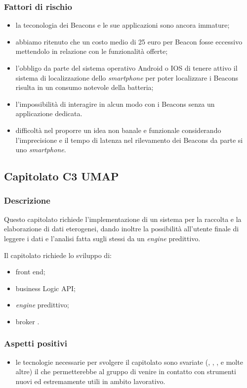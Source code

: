 \documentclass[12pt,a4paper]{article}
\begin{document}
\subsubsection{Fattori di rischio}
\begin{itemize}
\item la teconologia dei Beacons  e le sue applicazioni sono ancora immature;
\item abbiamo ritenuto che un costo medio di 25 euro per Beacon fosse eccessivo mettendolo in relazione con le funzionalità offerte;
\item l'obbligo da parte del sistema operativo Android o IOS di tenere attivo il sistema di localizzazione dello \textit{smartphone} per poter localizzare i Beacons risulta in un consumo notevole della batteria;
\item l'impossibilità di interagire in alcun modo con i Beacons senza un applicazione dedicata.
\item difficoltà nel proporre un idea non banale e funzionale considerando l'imprecisione e il tempo di latenza nel rilevamento dei Beacons da parte si uno \textit{smartphone}.
\end{itemize}

\newpage
\subsection{Capitolato C3 UMAP}

\subsubsection{Descrizione}

Questo capitolato richiede l'implementazione di un sistema per la  raccolta e la elaborazione di dati eterogenei, dando inoltre la possibilità all'utente finale di leggere i dati e l'analisi fatta sugli stessi da un \textit{engine} predittivo.

Il capitolato richiede lo sviluppo di:
\begin{itemize}
\item front end;
\item business Logic API; 
\item \textit{engine} predittivo;
\item broker . 
\end{itemize}

\subsubsection{Aspetti positivi}
\begin{itemize}
\item le tecnologie necessarie per svolgere il capitolato sono svariate (, ,  ,  e molte altre) il che permetterebbe al gruppo di venire in contatto con strumenti nuovi ed estremamente utili in ambito lavorativo.
\end{itemize}
\end{document}
